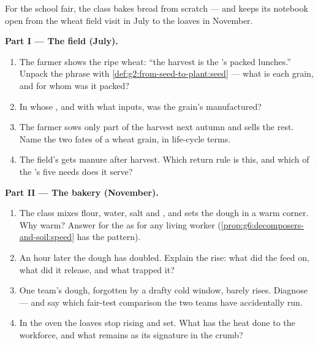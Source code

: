 \begin{problem}\label{pb:g6:producing-our-food:1}
For the school fair, the class bakes bread from scratch ---
and keeps its  notebook open from the wheat field
visit in July to the loaves in November.

\medskip\noindent\textbf{Part I --- The field (July).}
\begin{enumerate}
  \item The farmer shows the ripe wheat: ``the harvest is
        the 's packed lunches.'' Unpack the phrase
        with \cref{def:g2:from-seed-to-plant:seed} --- what
        is each grain, and for whom was it packed?
  \item In whose , and with what inputs, was the
        grain's  manufactured?
  \item The farmer sows only part of the harvest next
        autumn and sells the rest. Name the two fates of a
        wheat grain, in life-cycle terms.
  \item The field's  gets manure after harvest. Which
        return rule is this, and which of the 's five
        needs does it serve?
\end{enumerate}

\medskip\noindent\textbf{Part II --- The bakery (November).}
\begin{enumerate}[resume]
  \item The class mixes flour, water, salt and , and
        sets the dough in a warm corner. Why warm? Answer
        for the  as for any living worker
        (\cref{prop:g6:decomposers-and-soil:speed} has the
        pattern).
  \item An hour later the dough has doubled. Explain the
        rise: what did the  feed on, what did it
        release, and what trapped it?
  \item One team's dough, forgotten by a drafty cold
        window, barely rises. Diagnose --- and say which
        fair-test comparison the two teams have
        accidentally run.
  \item In the oven the loaves stop rising and set. What
        has the heat done to the workforce, and what
        remains as its signature in the crumb?
\end{enumerate}


\end{problem}
